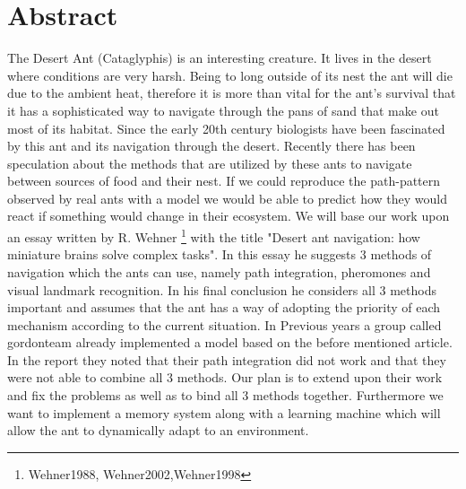 \documentclass[11pt]{article}
\begin{document}






\tableofcontents

\newpage




\section{Abstract}
The Desert Ant (Cataglyphis) is an interesting creature. It lives in the desert where conditions are very harsh. Being to long outside of its nest the ant will die due to the ambient heat, therefore it is more than vital for the ant's survival that it has a sophisticated way to navigate through the pans of sand that make out most of its habitat. Since the early 20th century biologists have been fascinated by this ant and its navigation through the desert. Recently there has been speculation about the methods that are utilized by these ants to navigate between sources of food and their nest. If we could reproduce the path-pattern observed by real ants with a model we would be able to predict how they would react if something would change in their ecosystem.
We will base our work upon an essay written by R. Wehner \footnote{Wehner1988\cite{xxx}, Wehner2002\cite{yyy},Wehner1998\cite{zzz}}
 with the title "Desert ant navigation: how miniature brains solve complex tasks". In this essay he suggests 3 methods of navigation which the ants can use, namely path integration, pheromones and visual landmark recognition. In his final conclusion he considers all 3 methods important and assumes that the ant has a way of adopting the priority of each mechanism according to the current situation.
In Previous years a group called gordonteam already implemented a model based on the before mentioned article. In the report they noted that their path integration did not work and that they were not able to combine all 3 methods. Our plan is to extend upon their work and fix the problems as well as to bind all 3 methods together. Furthermore we want to implement a memory system along with a learning machine which will allow the ant to dynamically adapt to an environment.
\end{document}
